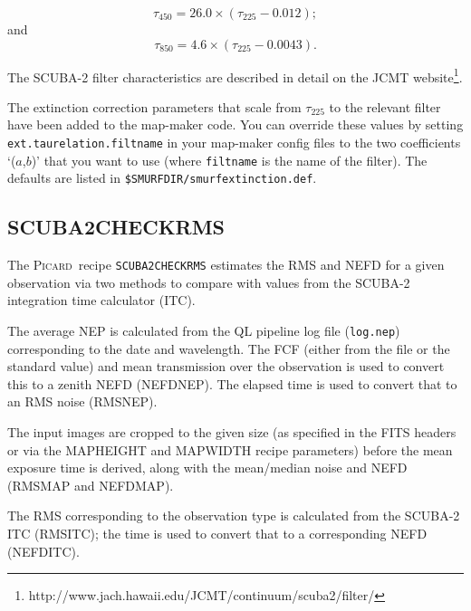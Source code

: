 \documentclass[twoside,11pt]{article}
\newcommand{\htmladdnormallinkfoot}[2]{#1\footnote{#2}}
\newcommand{\xref}[3]{#1}
\newcommand{\xlabel}[1]{}
\renewcommand{\_}{\texttt{\symbol{95}}}
\newcommand{\picard}{\xref{\textsc{Picard}}{sun265}{}}
\newcommand{\drrecipe}[1]{\texttt{#1}}
\newcommand{\param}[1]{\texttt{#1}}
\newcommand{\file}[1]{\texttt{#1}}
\begin{document}
\begin{equation}
\tau_{450} = 26.0 \times (\tau_{225} - 0.012);
\end{equation}
and
\begin{equation}
\tau_{850} = 4.6 \times (\tau_{225} - 0.0043).
\end{equation}

The SCUBA-2 filter characteristics are described in
detail \htmladdnormallinkfoot{on the JCMT
website}{http://www.jach.hawaii.edu/JCMT/continuum/scuba2/filter/}.

The extinction correction parameters that scale from $\tau_{225}$ to
the relevant filter have been added to the map-maker code. You can
override these values by setting \param{ext.taurelation.filtname} in
your map-maker config files to the two coefficients `($a$,$b$)' that you
want to use (where \param{filtname} is the name of the filter). The
defaults are listed in \file{\$SMURF\_DIR/smurf\_extinction.def}.

\newpage
\subsection{\xlabel{calcrms}SCUBA2\_CHECK\_RMS}
\label{app:checkrmsparams}
The \picard\ recipe \drrecipe{SCUBA2\_CHECK\_RMS} estimates the RMS and
NEFD for a given observation via two methods to compare with values from
the SCUBA-2 integration time calculator (ITC).

The average NEP is calculated from the QL pipeline log file (\file{log.nep})
corresponding to the date and wavelength. The FCF (either from the file
or the standard value) and mean transmission over the observation is used
to convert this to a zenith NEFD (NEFD\_NEP). The elapsed time is used to
convert that to an RMS noise (RMS\_NEP).

The input images are cropped to the given size (as specified in the FITS
headers or via the MAP\_HEIGHT and MAP\_WIDTH recipe parameters) before the
mean exposure time is derived, along with the mean/median noise and NEFD
(RMS\_MAP and NEFD\_MAP).

The RMS corresponding to the observation type is calculated from the
SCUBA-2 ITC (RMS\_ITC); the time is used to convert that to a corresponding
NEFD (NEFD\_ITC).
\end{document}
